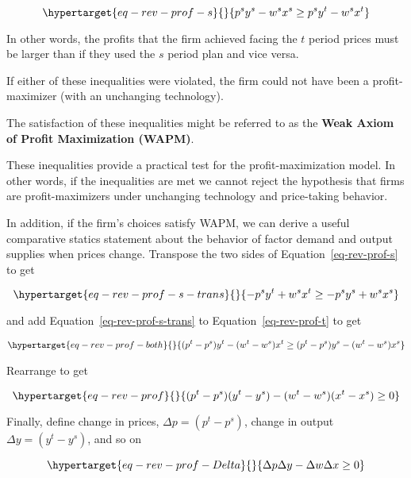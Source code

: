 \documentclass[
]{article}
\begin{document}
\begin{equation}\protect\hypertarget{eq-rev-prof-s}{}{
p^sy^s-w^sx^s\ge p^sy^t-w^sx^t
}\label{eq-rev-prof-s}\end{equation}

In other words, the profits that the firm achieved facing the \(t\)
period prices must be larger than if they used the \(s\) period plan and
vice versa.

If either of these inequalities were violated, the firm could not have
been a profit-maximizer (with an unchanging technology).

The satisfaction of these inequalities might be referred to as the
\textbf{Weak Axiom of Profit Maximization (WAPM)}.

These inequalities provide a practical test for the profit-maximization
model. In other words, if the inequalities are met we cannot reject the
hypothesis that firms are profit-maximizers under unchanging technology
and price-taking behavior.

In addition, if the firm's choices satisfy WAPM, we can derive a useful
comparative statics statement about the behavior of factor demand and
output supplies when prices change. Transpose the two sides of
Equation~\ref{eq-rev-prof-s} to get

\begin{equation}\protect\hypertarget{eq-rev-prof-s-trans}{}{
-p^sy^t+w^sx^t\ge -p^sy^s+w^sx^s
}\label{eq-rev-prof-s-trans}\end{equation}

and add Equation~\ref{eq-rev-prof-s-trans} to
Equation~\ref{eq-rev-prof-t} to get

\begin{equation}\protect\hypertarget{eq-rev-prof-both}{}{
\begin{aligned}
(p^t-p^s)y^t-(w^t-w^s)x^t \ge (p^t-p^s)y^s-(w^t-w^s)x^s
\end{aligned}
}\label{eq-rev-prof-both}\end{equation}

Rearrange to get

\begin{equation}\protect\hypertarget{eq-rev-prof}{}{
(p^t-p^s)(y^t-y^s)-(w^t-w^s)(x^t-x^s) \ge 0
}\label{eq-rev-prof}\end{equation}

Finally, define change in prices, \(\Delta p=(p^t-p^s)\), change in
output \(\Delta y = (y^t-y^s)\), and so on

\begin{equation}\protect\hypertarget{eq-rev-prof-Delta}{}{
\Delta p \Delta y - \Delta w \Delta x \ge 0
}\label{eq-rev-prof-Delta}\end{equation}
\end{document}
